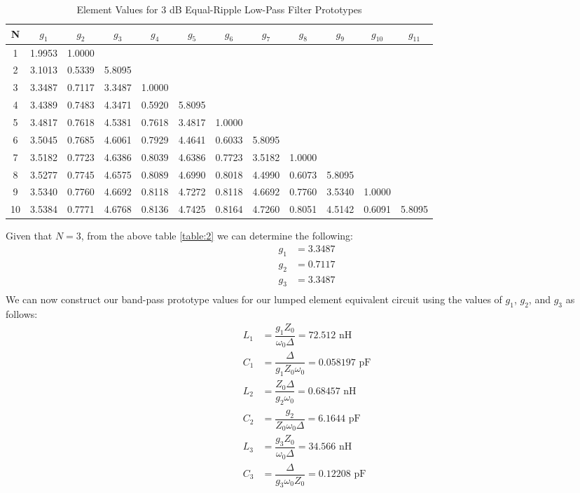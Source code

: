 \documentclass{article}
\begin{document}
\begin{table}[h!]
\centering
\begin{tabular}{| c | c | c | c | c | c | c | c | c | c | c | c |} 
 \hline
 N & $g_1$ & $g_2$ & $g_3$ & $g_4$ & $g_5$ & $g_6$ & $g_7$ & $g_8$ & $g_9$ & $g_{10}$ & $g_{11}$ \\ [0.5ex] 
 \hline
 1 & 1.9953 & 1.0000 & & & & & & & & & \\ 
 \hline
 2 & 3.1013 & 0.5339 & 5.8095 & & & & & & & & \\
 \hline
 3 & 3.3487 & 0.7117 & 3.3487 & 1.0000 & & & & & & & \\
 \hline
 4 & 3.4389 & 0.7483 & 4.3471 & 0.5920 & 5.8095 & & & & & & \\
 \hline
 5 & 3.4817 & 0.7618 & 4.5381 & 0.7618 & 3.4817 & 1.0000 & & & & & \\
 \hline
 6 & 3.5045 & 0.7685 & 4.6061 & 0.7929 & 4.4641 & 0.6033 & 5.8095 & & & & \\
 \hline
 7 & 3.5182 & 0.7723 & 4.6386 & 0.8039 & 4.6386 & 0.7723 & 3.5182 & 1.0000 & & & \\
 \hline
 8 & 3.5277 & 0.7745 & 4.6575 & 0.8089 & 4.6990 & 0.8018 & 4.4990 & 0.6073 & 5.8095 & & \\
 \hline
 9 & 3.5340 & 0.7760 & 4.6692 & 0.8118 & 4.7272 & 0.8118 & 4.6692 & 0.7760 & 3.5340 & 1.0000 & \\
 \hline
 10 & 3.5384 & 0.7771 & 4.6768 & 0.8136 & 4.7425 & 0.8164 & 4.7260 & 0.8051 & 4.5142 & 0.6091 & 5.8095 \\
 \hline
\end{tabular}
\caption{Element Values for 3 dB Equal-Ripple Low-Pass Filter Prototypes}
\label{table:4}
\end{table}
Given that $N=3$, from the above table \ref{table:2} we can determine the following:
\begin{align*}
    g_1 &= 3.3487 \\
    g_2 &= 0.7117 \\
    g_3 &= 3.3487 \\
\end{align*}
We can now construct our band-pass prototype values for our lumped element equivalent circuit using the values of $g_1$, $g_2$, and $g_3$ as follows:
\begin{align}
    L_1 &= \dfrac{g_1 Z_0}{\omega_0 \Delta} = 72.512 \text{ nH} \\
    C_1 &= \dfrac{\Delta}{g_1 Z_0 \omega_0} = 0.058197 \text{ pF} \\
    L_2 &= \dfrac{Z_0 \Delta}{g_2 \omega_0} = 0.68457 \text{ nH} \\
    C_2 &= \dfrac{g_2}{Z_0 \omega_0 \Delta} = 6.1644 \text{ pF} \\
    L_3 &= \dfrac{g_3 Z_0}{\omega_0 \Delta} = 34.566 \text{ nH} \\
    C_3 &= \dfrac{\Delta}{g_3 \omega_0 Z_0} = 0.12208 \text{ pF}
\end{align}
\end{document}
